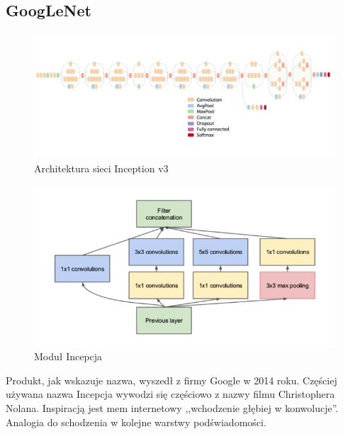 \documentclass[12pt,a4paper,twoside,titlepage,openright]{book}
\begin{document}
\begin{itemize}
\begin{itemize}
\section{GoogLeNet}
\begin{figure}[h]
	\centering
			\includegraphics[resolution=100, scale=0.36]{inceptionv3architecture.png}
		\caption{Architektura sieci Inception v3}
\end{figure}

\begin{figure}[ht]
	\centering
			\includegraphics[resolution=100, scale=0.7]{inceptionModule.png}
		\caption{Moduł Incepcja}
\end{figure}

Produkt, jak wskazuje nazwa, wyszedł z firmy Google w 2014 roku. Częściej używana nazwa Incepcja wywodzi się częściowo z nazwy filmu Christophera Nolana. Inspiracją jest mem internetowy ,,wchodzenie głębiej w konwolucje''. Analogia do schodzenia w kolejne warstwy podświadomości.\cite{siteDeeper}


\end{itemize}
\end{itemize}
\end{document}
